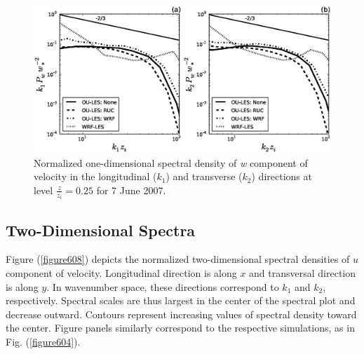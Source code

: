 \begin{figure}[H]
\begin{center}
\includegraphics[width=\textwidth]{figures/chapter6/spectra1D_w_20070607}
\end{center}
\caption{Normalized one-dimensional spectral density of \textit{w} component of velocity in the longitudinal ($k_1$) and transverse ($k_2$) directions at level $\frac{z}{z_i}=0.25$ for 7 June 2007.}
\label{figure607}
\end{figure}


\subsection{Two-Dimensional Spectra}
\label{spectra2d-624}

Figure (\autoref{figure608}) depicts the normalized two-dimensional spectral densities of $u$ component of velocity. Longitudinal direction is along $x$ and transversal direction is along $y$. In wavenumber space, these directions correspond to $k_1$ and $k_2$, respectively. Spectral scales are thus largest in the center of the spectral plot and decrease outward. Contours represent increasing values of spectral density toward the center. Figure panels similarly correspond to the respective simulations, as in Fig. (\autoref{figure604}).


